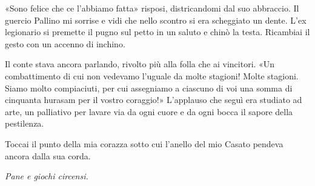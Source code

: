 «Sono felice che ce l'abbiamo fatta» risposi, districandomi dal suo
abbraccio. Il guercio Pallino mi sorrise e vidi che nello scontro si era
scheggiato un dente. L'ex legionario si premette il pugno sul petto in
un saluto e chinò la testa. Ricambiai il gesto con un accenno di
inchino.

Il conte stava ancora parlando, rivolto più alla folla che ai vincitori.
«Un combattimento di cui non vedevamo l'uguale da molte stagioni! Molte
stagioni. Siamo molto compiaciuti, per cui assegniamo a ciascuno di voi
una somma di cinquanta hurasam per il vostro coraggio!» L'applauso che
seguì era studiato ad arte, un palliativo per lavare via da ogni cuore e
da ogni bocca il sapore della pestilenza.

Toccai il punto della mia corazza sotto cui l'anello del mio Casato
pendeva ancora dalla sua corda.

\emph{Pane e giochi circensi.}

